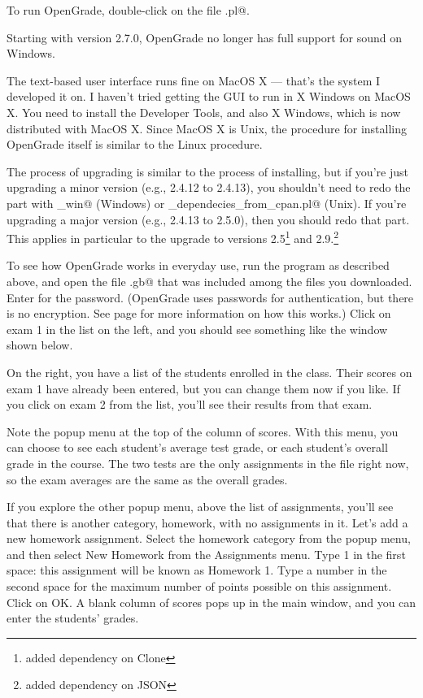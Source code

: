 \documentclass{opengrade_doc}
\begin{document}
To run OpenGrade, double-click on the file \verb@opengrade.pl@.

Starting with version 2.7.0, OpenGrade no longer has full support for sound on Windows.

The text-based user interface runs fine on MacOS X --- that's
the system I developed it on. I haven't tried getting the GUI
to run in X Windows on MacOS X.
You need to install the Developer Tools, and also X Windows, which is
now distributed with MacOS X.
Since MacOS X is Unix, the procedure for installing OpenGrade itself is similar
to the Linux procedure. 

\label{upgrading}
The process of upgrading is similar to the process of installing, but if you're just
upgrading a minor version (e.g., 2.4.12 to 2.4.13), you shouldn't need to redo the part with
\verb@install_win@ (Windows) or \verb@get_dependecies_from_cpan.pl@ (Unix).
If you're upgrading a major version (e.g., 2.4.13 to 2.5.0), then you should redo that part. 
This applies in particular to the upgrade to versions 2.5\footnote{added dependency on Clone} and 
2.9.\footnote{added dependency on JSON}


\label{gui}

To see how OpenGrade works in everyday use, run the program as
described above, and open the file \verb@sample.gb@ that was
included among the files you downloaded. Enter \verb@secret@ for
the password. (OpenGrade uses passwords for authentication, but
there is no encryption. See page \pageref{authentication} for
more information on how this works.) Click on
exam 1 in the list on the left, and you should see something
like the window shown below.


On the right, you have a list of the students enrolled in the
class. Their scores on exam 1 have already been entered, but
you can change them now if you like. If you click on exam 2
from the list, you'll see their results from that exam.

Note the popup menu at the top of the column of scores.
With this menu, you can choose to see each student's average
test grade, or each student's overall grade in the course.
The two tests are the only assignments in the file right now,
so the exam averages are the same as the overall grades.

If you explore the other popup menu, above the list of assignments, you'll
see that there is another category, homework,
with no assignments in it. Let's add a new homework assignment.
Select the homework category from the popup menu, and then select
New Homework from the Assignments menu. Type 1 in the first space:
this assignment will be known as Homework 1. Type a number in the second
space for the maximum number of points possible on this assignment.
Click on OK. A blank column of scores pops up in the main window, and you can
enter the students' grades.
\end{document}
